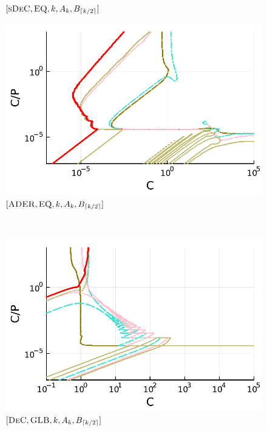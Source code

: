 \begin{figure}
\begin{minipage}[t]{0.32\textwidth}
		\small$[\textsc{sDeC}, \textsc{EQ},k, A_k,B_{\lceil k/2 \rceil}]$\par
	\end{minipage}
	\begin{minipage}[t]{0.32\textwidth}
		\centering
		\includegraphics[width=\textwidth]{pdf/pdepics/disp/IMEXADER_equispaced_disp_all_2-6_newE.pdf}
		\small$[\textsc{ADER}, \textsc{EQ},k, A_k,B_{\lceil k/2 \rceil}]$\par
	\end{minipage}\\
	\begin{minipage}[t]{0.32\textwidth}
		\centering
		\includegraphics[width=\textwidth]{pdf/pdepics/disp/IMEXDeC_gaussLobatto_disp_all_2-6_newE.pdf}
		\small$[\textsc{DeC}, \textsc{GLB},k, A_k,B_{\lceil k/2 \rceil}]$\par
	\end{minipage}
	\begin{minipage}[t]{0.32\textwidth}

\end{minipage}
\end{figure}

